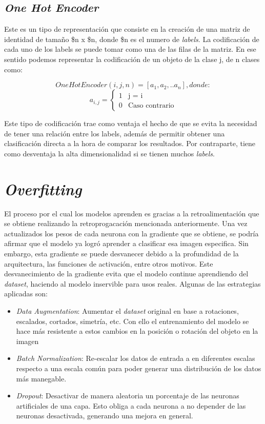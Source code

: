 \subsection {\textit{One Hot Encoder}}
Este es un tipo de representación que consiste en la creación de una matriz de identidad 
de tamaño \$n x \$n, donde \$n es el numero de \textit{labels}. La codificación de cada uno de 
los labels se puede tomar como una de las filas de la matriz. En ese sentido podemos 
representar la codificación de un objeto de la clase j, de n clases como:

$$OneHotEncoder(i,j,n)= [a_1,a_2, .. a_n], donde: $$
\begin{equation*}
a_{i,j}=
\begin{cases}
1 & \text{j = i}\\
0 &  \text{Caso contrario}
\end{cases}
\end{equation*}

Este tipo de codificación trae como ventaja el hecho de que se evita la necesidad 
de tener una relación entre los labels, además de permitir obtener una clasificación 
directa a la hora de comparar los resultados. Por contraparte, tiene como desventaja 
la alta dimensionalidad si se tienen muchos \textit{labels}.



\section{\textit{Overfitting}}
El proceso por el cual los modelos aprenden es gracias a la retroalimentación que se obtiene realizando la retroprogacación mencionada anteriormente. Una vez actualizados los pesos de cada neurona con la gradiente que se obtiene, se podría afirmar que el modelo ya logró aprender a clasificar esa imagen especifica. Sin embargo, esta gradiente se puede desvanecer debido a la profundidad de la arquitectura, las funciones de activación, entre otros motivos. Este desvanecimiento de la gradiente evita que el modelo continue aprendiendo del \textit{dataset}, haciendo al modelo inservible para usos reales. Algunas de las estrategias aplicadas son: 

\begin{itemize}
    \item {\textit{Data Augmentation}: Aumentar el \textit{dataset} original en base a rotaciones, escalados, cortados, simetría, etc. Con ello el entrenamiento del modelo se hace más resistente a estos cambios en la posición o rotación del objeto en la imagen }
    \item {\textit{Batch Normalization}: Re-escalar los datos de entrada a en diferentes escalas respecto a una escala común para poder generar una distribución de los datos más manegable.}
    \item {\textit{Dropout}: Desactivar de manera aleatoria un porcentaje de las neuronas artificiales de una capa. Esto obliga a cada neurona a no depender de las neuronas desactivada, generando una mejora en general.}
\end{itemize}

